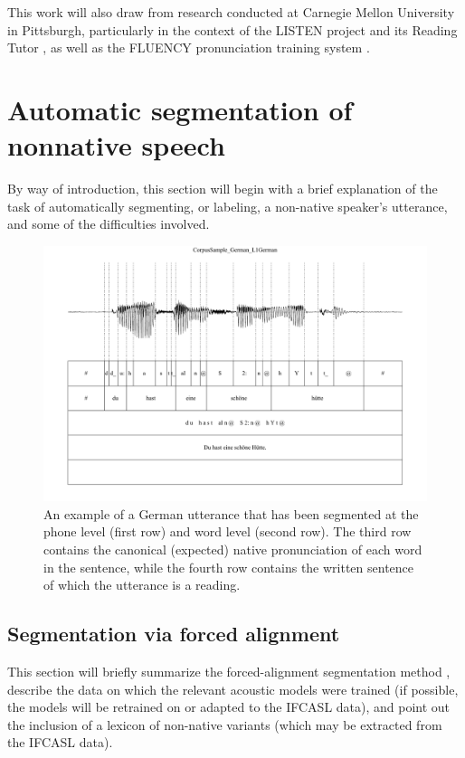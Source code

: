 	This work will also draw from research conducted at Carnegie Mellon University in Pittsburgh, particularly in the context of the LISTEN project and its Reading Tutor \citep{Duong2011,Mostow2012,Mostow1999,Sitaram2011,Weber2010}, as well as the FLUENCY pronunciation training system \cite{Eskenazi1998,Probst2002}.

\section{Automatic segmentation of nonnative speech}
\label{sec:diag:segmentation}

	By way of introduction, this section will begin with a brief explanation of the task of automatically segmenting, or labeling, a non-native speaker's utterance, and some of the difficulties involved.
	
	\begin{figure}
		\centering
		\includegraphics[width=\textwidth]{../img/screenshots/SampleGG-basic}
		\caption{An example of a German utterance that has been segmented at the phone level (first row) and word level (second row). The third row contains the canonical (expected) native pronunciation of each word in the sentence, while the fourth row contains the written sentence of which the utterance is a reading.}
		\label{fig:GGsegmentation}
	\end{figure}

	\subsection{Segmentation via forced alignment}
	\label{sec:segmentation:alignment}
	
	This section will briefly summarize the forced-alignment segmentation method \citep[etc.]{Fohr1996,Mesbahi2011}, describe the data on which the relevant acoustic models were trained (if possible, the models will be retrained on or adapted to the IFCASL data), and point out the inclusion of a lexicon of non-native variants (which may be extracted from the IFCASL data).
	
